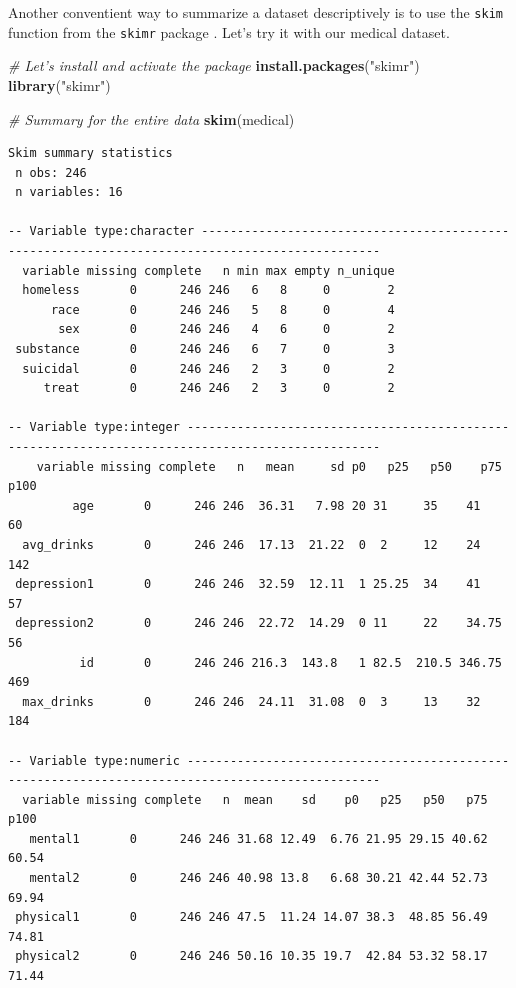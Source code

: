 \documentclass[]{book}
\newenvironment{Shaded}{\begin{snugshade}}{\end{snugshade}}
\newcommand{\CommentTok}[1]{\textcolor[rgb]{0.56,0.35,0.01}{\textit{#1}}}
\newcommand{\KeywordTok}[1]{\textcolor[rgb]{0.13,0.29,0.53}{\textbf{#1}}}
\newcommand{\NormalTok}[1]{#1}
\newcommand{\StringTok}[1]{\textcolor[rgb]{0.31,0.60,0.02}{#1}}
\begin{document}
Another conventient way to summarize a dataset descriptively is to use the \texttt{skim} function from the \texttt{skimr} package \citep{R-skimr}. Let's try it with our medical dataset.

\begin{Shaded}
\begin{Highlighting}[]
\CommentTok{# Let's install and activate the package}
\KeywordTok{install.packages}\NormalTok{(}\StringTok{"skimr"}\NormalTok{)}
\KeywordTok{library}\NormalTok{(}\StringTok{"skimr"}\NormalTok{)}
\end{Highlighting}
\end{Shaded}

\begin{Shaded}
\begin{Highlighting}[]
\CommentTok{# Summary for the entire data}
\KeywordTok{skim}\NormalTok{(medical)}
\end{Highlighting}
\end{Shaded}

\begin{verbatim}
Skim summary statistics
 n obs: 246 
 n variables: 16 

-- Variable type:character -----------------------------------------------------------------------------------------------
  variable missing complete   n min max empty n_unique
  homeless       0      246 246   6   8     0        2
      race       0      246 246   5   8     0        4
       sex       0      246 246   4   6     0        2
 substance       0      246 246   6   7     0        3
  suicidal       0      246 246   2   3     0        2
     treat       0      246 246   2   3     0        2

-- Variable type:integer -------------------------------------------------------------------------------------------------
    variable missing complete   n   mean     sd p0   p25   p50    p75 p100
         age       0      246 246  36.31   7.98 20 31     35    41      60
  avg_drinks       0      246 246  17.13  21.22  0  2     12    24     142
 depression1       0      246 246  32.59  12.11  1 25.25  34    41      57
 depression2       0      246 246  22.72  14.29  0 11     22    34.75   56
          id       0      246 246 216.3  143.8   1 82.5  210.5 346.75  469
  max_drinks       0      246 246  24.11  31.08  0  3     13    32     184

-- Variable type:numeric -------------------------------------------------------------------------------------------------
  variable missing complete   n  mean    sd    p0   p25   p50   p75  p100
   mental1       0      246 246 31.68 12.49  6.76 21.95 29.15 40.62 60.54
   mental2       0      246 246 40.98 13.8   6.68 30.21 42.44 52.73 69.94
 physical1       0      246 246 47.5  11.24 14.07 38.3  48.85 56.49 74.81
 physical2       0      246 246 50.16 10.35 19.7  42.84 53.32 58.17 71.44
\end{verbatim}
\end{document}
